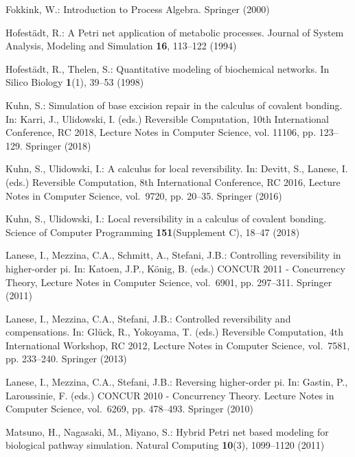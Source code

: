 \documentclass[runningheads]{llncs}
\begin{document}
\begin{thebibliography}{10}
Fokkink, W.: Introduction to Process Algebra. Springer (2000)

Hofest{\"{a}}dt, R.: A {P}etri net application of metabolic processes. Journal
  of System Analysis, Modeling and Simulation  \textbf{16},  113--122 (1994)

Hofest{\"{a}}dt, R., Thelen, S.: Quantitative modeling of biochemical networks.
  In Silico Biology  \textbf{1}(1),  39--53 (1998)

Kuhn, S.: Simulation of base excision repair in the calculus of covalent
  bonding. In: Karri, J., Ulidowski, I. (eds.) Reversible Computation, 10th
  International Conference, RC 2018, Lecture Notes in Computer Science, vol.
  11106, pp. 123--129. Springer (2018)

Kuhn, S., Ulidowski, I.: A calculus for local reversibility. In: Devitt, S.,
  Lanese, I. (eds.) Reversible Computation, 8th International Conference, RC
  2016, Lecture Notes in Computer Science, vol.~9720, pp. 20--35. Springer
  (2016)

Kuhn, S., Ulidowski, I.: Local reversibility in a calculus of covalent bonding.
  Science of Computer Programming  \textbf{151}(Supplement C),  18--47 (2018)

Lanese, I., Mezzina, C.A., Schmitt, A., Stefani, J.B.: Controlling
  reversibility in higher-order pi. In: Katoen, J.P., K{\"o}nig, B. (eds.)
  CONCUR 2011 - Concurrency Theory, Lecture Notes in Computer Science,
  vol.~6901, pp. 297--311. Springer (2011)

Lanese, I., Mezzina, C.A., Stefani, J.B.: Controlled reversibility and
  compensations. In: Gl{\"u}ck, R., Yokoyama, T. (eds.) Reversible Computation,
  4th International Workshop, RC 2012, Lecture Notes in Computer Science,
  vol.~7581, pp. 233--240. Springer (2013)

Lanese, I., Mezzina, C.A., Stefani, J.B.: Reversing higher-order pi. In:
  Gastin, P., Laroussinie, F. (eds.) CONCUR 2010 - Concurrency Theory. Lecture
  Notes in Computer Science, vol.~6269, pp. 478--493. Springer (2010)

Matsuno, H., Nagasaki, M., Miyano, S.: Hybrid {P}etri net based modeling for
  biological pathway simulation. Natural Computing  \textbf{10}(3),  1099--1120
  (2011)


\end{thebibliography}
\end{document}
